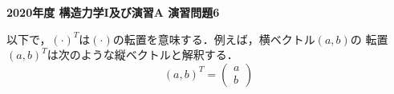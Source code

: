 \documentclass[10pt,a4j]{jarticle}
\newlength{\minitwocolumn}
\begin{document}
\newcommand{\fat}[1]{\mbox{\boldmath $#1$}}
\newcommand{\D}{\partial}
\newcommand{\w}{\omega}
\newcommand{\ga}{\alpha}
\newcommand{\gb}{\beta}
\newcommand{\gx}{\xi}
\newcommand{\gz}{\zeta}
\newcommand{\vhat}[1]{\hat{\fat{#1}}}
\newcommand{\spc}{\vspace{0.7\baselineskip}}
\newcommand{\halfspc}{\vspace{0.3\baselineskip}}

\pagestyle{empty}
\newcommand{\twofig}[2]
 {
   \begin{figure}[h]
     \begin{minipage}[t]{\minitwocolumn}
         \begin{center}   #1
         \end{center}
     \end{minipage}
         \hspace{\columnsep}
     \begin{minipage}[t]{\minitwocolumn}
         \begin{center} #2
         \end{center}
     \end{minipage}
   \end{figure}
 }
\begin{center}
{\Large \bf2020年度 構造力学I及び演習A 演習問題6}
\end{center}
以下で，$(\cdot)^T$は$(\cdot)$の転置を意味する．例えば，横ベクトル$(a,b)$の
転置$(a,b)^T$は次のような縦ベクトルと解釈する．
\[
	(a,b)^T=\left(
	\begin{array}{c}
		a \\
		b
	\end{array}
	\right)
\]
\end{document}

